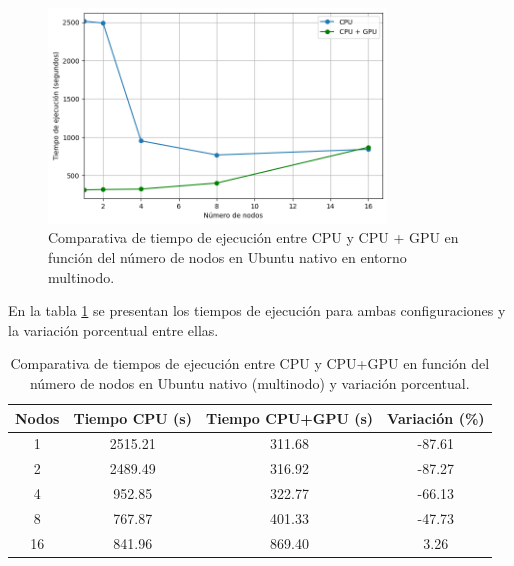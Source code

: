 \begin{figure}[H]
    \centering
    \includegraphics[width=0.8\textwidth]{imagenes/cap5/multi-node_ubuntu_cpu_vs_gpu_native_time.png}
    \caption{Comparativa de tiempo de ejecución entre CPU y CPU + GPU en función del número de nodos en Ubuntu nativo en entorno multinodo.}
    \label{fig:multi-node_ubuntu_cpu_vs_gpu_native_time}
\end{figure}

En la tabla \ref{tab:multi-node_ubuntu_cpu_vs_gpu_native} se presentan los tiempos de ejecución para ambas configuraciones y la variación porcentual entre ellas.

\begin{table}[ht]
    \centering
    \begin{tabular}{|c|c|c|c|}
        \hline
        \textbf{Nodos} & \textbf{Tiempo CPU (s)} & \textbf{Tiempo CPU+GPU (s)} & \textbf{Variación (\%)} \\
        \hline
        1              & 2515.21                 & 311.68                      & -87.61                  \\
        2              & 2489.49                 & 316.92                      & -87.27                  \\
        4              & 952.85                  & 322.77                      & -66.13                  \\
        8              & 767.87                  & 401.33                      & -47.73                  \\
        16             & 841.96                  & 869.40                      & 3.26                    \\
        \hline
    \end{tabular}
    \caption{Comparativa de tiempos de ejecución entre CPU y CPU+GPU en función del número de nodos en Ubuntu nativo (multinodo) y variación porcentual.}
    \label{tab:multi-node_ubuntu_cpu_vs_gpu_native}
\end{table}

